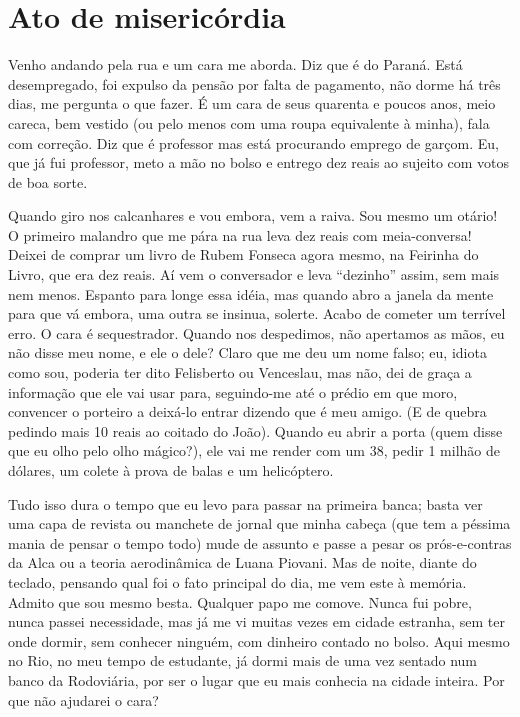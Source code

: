 \chapter{Ato de misericórdia}

Venho andando pela rua e um cara me aborda. Diz que é do Paraná. Está
desempregado, foi expulso da pensão por falta de pagamento, não dorme
há três dias, me pergunta o que fazer. É um cara de seus quarenta e
poucos anos, meio careca, bem vestido (ou pelo menos com uma roupa
equivalente à minha), fala com correção. Diz que é professor mas está
procurando emprego de garçom. Eu, que já fui professor, meto a mão no
bolso e entrego dez reais ao sujeito com votos de boa sorte.

Quando giro nos calcanhares e vou embora, vem a raiva. Sou mesmo um
otário! O primeiro malandro que me pára na rua leva dez reais com
meia-conversa! Deixei de comprar um livro de Rubem Fonseca agora
mesmo, na Feirinha do Livro, que era dez reais. Aí vem o conversador
e leva “dezinho” assim, sem mais nem menos. Espanto para longe essa
idéia, mas quando abro a janela da mente para que vá embora, uma
outra se insinua, solerte. Acabo de cometer um terrível erro. O cara
é sequestrador. Quando nos despedimos, não apertamos as mãos, eu não
disse meu nome, e ele o dele? Claro que me deu um nome falso; eu,
idiota como sou, poderia ter dito Felisberto ou Venceslau, mas não,
dei de graça a informação que ele vai usar para, seguindo-me até o
prédio em que moro, convencer o porteiro a deixá-lo entrar dizendo
que é meu amigo. (E de quebra pedindo mais 10 reais ao coitado do
João). Quando eu abrir a porta (quem disse que eu olho pelo olho
mágico?), ele vai me render com um 38, pedir 1 milhão de dólares, um
colete à prova de balas e um helicóptero.

Tudo isso dura o tempo que eu levo para passar na primeira banca;
basta ver uma capa de revista ou manchete de jornal que minha cabeça
(que tem a péssima mania de pensar o tempo todo) mude de assunto e
passe a pesar os prós-e-contras da Alca ou a teoria aerodinâmica de
Luana Piovani. Mas de noite, diante do teclado, pensando qual foi o
fato principal do dia, me vem este à memória. Admito que sou mesmo
besta. Qualquer papo me comove. Nunca fui pobre, nunca passei
necessidade, mas já me vi muitas vezes em cidade estranha, sem ter
onde dormir, sem conhecer ninguém, com dinheiro contado no bolso.
Aqui mesmo no Rio, no meu tempo de estudante, já dormi mais de uma
vez sentado num banco da Rodoviária, por ser o lugar que eu mais
conhecia na cidade inteira. Por que não ajudarei o cara?

